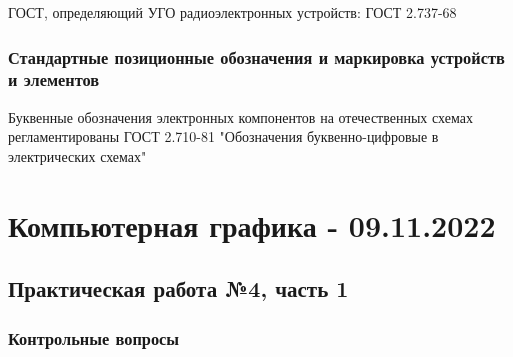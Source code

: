 \documentclass{article}
\begin{document}
\begin{flushleft}
ГОСТ, определяющий УГО радиоэлектронных устройств: ГОСТ 2.737-68

\subsubsection{Стандартные позиционные обозначения и маркировка устройств и элементов}

Буквенные обозначения электронных компонентов на отечественных схемах регламентированы ГОСТ 2.710-81 "Обозначения буквенно-цифровые в электрических схемах"

\end{flushleft}

\pagebreak
\section{Компьютерная графика - 09.11.2022}

\subsection{Практическая работа №4, часть 1}

\subsubsection{Контрольные вопросы}
\end{document}
